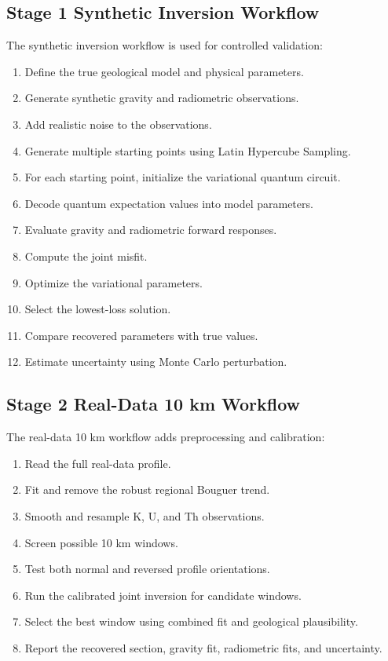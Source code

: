 \documentclass[12pt,a4paper]{article}
\begin{document}
\subsection{Stage 1 Synthetic Inversion Workflow}
The synthetic inversion workflow is used for controlled validation:
\begin{enumerate}
    \item Define the true geological model and physical parameters.
    \item Generate synthetic gravity and radiometric observations.
    \item Add realistic noise to the observations.
    \item Generate multiple starting points using Latin Hypercube Sampling.
    \item For each starting point, initialize the variational quantum circuit.
    \item Decode quantum expectation values into model parameters.
    \item Evaluate gravity and radiometric forward responses.
    \item Compute the joint misfit.
    \item Optimize the variational parameters.
    \item Select the lowest-loss solution.
    \item Compare recovered parameters with true values.
    \item Estimate uncertainty using Monte Carlo perturbation.
\end{enumerate}

\subsection{Stage 2 Real-Data 10 km Workflow}
The real-data 10 km workflow adds preprocessing and calibration:
\begin{enumerate}
    \item Read the full real-data profile.
    \item Fit and remove the robust regional Bouguer trend.
    \item Smooth and resample K, U, and Th observations.
    \item Screen possible 10 km windows.
    \item Test both normal and reversed profile orientations.
    \item Run the calibrated joint inversion for candidate windows.
    \item Select the best window using combined fit and geological plausibility.
    \item Report the recovered section, gravity fit, radiometric fits, and uncertainty.
\end{enumerate}
\end{document}

